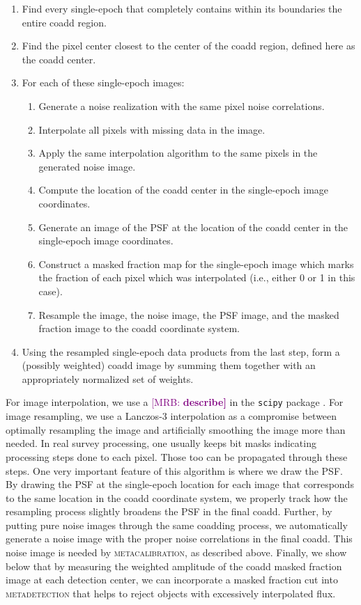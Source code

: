 \documentclass[twocolappendix, appendixfloats, numberedappendix, twocolumn, apj]{openjournal}
\newcommand{\mrb}[1]{\textcolor{purple}{[MRB: \bf #1]}\xspace}
\newcommand{\mdet}{\textsc{metadetection}\xspace}
\newcommand{\mcal}{\textsc{metacalibration}\xspace}
\begin{document}
\begin{enumerate}
\item Find every single-epoch that completely contains within its boundaries the entire coadd region.
\item Find the pixel center closest to the center of the coadd region, defined here as the coadd center.
\item For each of these single-epoch images:
\begin{enumerate}
  \item Generate a noise realization with the same pixel noise correlations.
  \item Interpolate all pixels with missing data in the image.
  \item Apply the same interpolation algorithm to the same pixels in the generated noise image.
  \item Compute the location of the coadd center in the single-epoch image coordinates.
  \item Generate an image of the PSF at the location of the coadd center in the single-epoch image coordinates.
  \item Construct a masked fraction map for the single-epoch image which marks the fraction of each pixel
  which was interpolated (i.e., either 0 or 1 in this case).
  \item Resample the image, the noise image, the PSF image, and the masked fraction image to the coadd coordinate system.
\end{enumerate}
\item Using the resampled single-epoch data products from the last step, form a (possibly weighted) coadd image
by summing them together with an appropriately normalized set of weights.
\end{enumerate}
For image interpolation, we use a \mrb{describe} in the \texttt{scipy} package \citep{scipy}. For image resampling,
we use a Lanczos-3 interpolation as a compromise between optimally resampling the image and artificially
smoothing the image more than needed. In real survey processing, one usually keeps bit masks indicating
processing steps done to each pixel. Those too can be propagated through these steps. One very important
feature of this algorithm is where we draw the PSF. By drawing the PSF at the single-epoch location for each
image that corresponds to the same location in the coadd coordinate system, we properly track how the resampling
process slightly broadens the PSF in the final coadd. Further, by putting pure noise images through the same
coadding process, we automatically generate a noise image with the proper noise correlations in the final coadd.
This noise image is needed by \mcal, as described above. Finally, we show below that by measuring the weighted
amplitude of the coadd masked fraction image at each detection center, we can incorporate a masked fraction cut
into \mdet that helps to reject objects with excessively interpolated flux.
\end{document}
